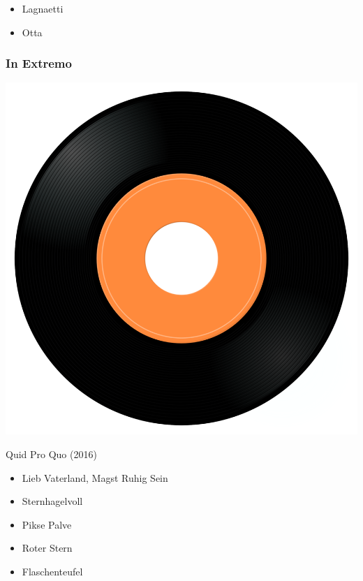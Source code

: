 \begin{minipage}[t]{0.25\textwidth}\vspace{0pt}
\begin{itemize}[nosep,leftmargin=1em,labelwidth=*,align=left]
	\setlength{\itemsep}{0pt}
	\item Lagnaetti
	\item Otta
\end{itemize}
\end{minipage}

\subsubsection{In Extremo}

\begin{minipage}[t]{0.25\textwidth}
\captionsetup{type=figure}
\includegraphics[width=\textwidth]{Images/cover.png}
\caption*{Quid Pro Quo (2016)}
\end{minipage}
\begin{minipage}[t]{0.25\textwidth}\vspace{0pt}
\begin{itemize}[nosep,leftmargin=1em,labelwidth=*,align=left]
	\setlength{\itemsep}{0pt}
	\item Lieb Vaterland, Magst Ruhig Sein
	\item Sternhagelvoll
	\item Pikse Palve
	\item Roter Stern
	\item Flaschenteufel
\end{itemize}
\end{minipage}

